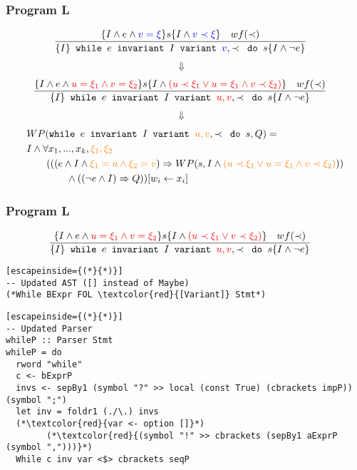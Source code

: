 \begin{frame}[containsverbatim]
  \frametitle{Program L}
\begin{align*}
  &\frac{
    \{I \land e \land \textcolor{blue}{v = \xi} \} s \{I \land \textcolor{blue}{v \prec \xi} \} \quad wf(\prec)
  }{
    \{I\} \texttt{ while } e \texttt{ invariant } I
          \texttt{ variant } \textcolor{blue}{v}, \prec \texttt{ do } s \{I \land \neg e\}
  }
\end{align*}
\begin{align*}
  \Downarrow &
\end{align*}
\begin{align*}
  &\frac{
    \{I \land e \land \textcolor{red}{u = \xi_{1} \land v = \xi_{2}} \} s \{I \land \textcolor{red}{(u \prec \xi_{1} \lor u = \xi_{1} \land v \prec \xi_{2})} \} \quad wf(\prec)
  }{
    \{I\} \texttt{ while } e \texttt{ invariant } I
          \texttt{ variant } \textcolor{red}{u,v} , \prec \texttt{ do } s \{I \land \neg e\}
  }
\end{align*}
\begin{align*}
  \Downarrow &
\end{align*}
\begin{align*}
&WP(
    \texttt{while } e \texttt{ invariant } I
    \texttt{ variant } \textcolor{orange}{u,v}, \prec \texttt{ do } s
, Q)
=\\
&I \land \forall x_1, ..., x_k, \textcolor{orange}{\xi_{1}, \xi_{2}}\\
&\quad \quad (((e \land I \land \textcolor{orange}{\xi_{1} = u \land \xi_{2} = v}) \Rightarrow WP(s, I \land \textcolor{orange}{(u \prec \xi_{1} \lor u = \xi_{1} \land v \prec \xi_{2})})) \\
&\quad \quad \quad \quad \land ((\neg e \land I) \Rightarrow Q)) [w_i \leftarrow x_i] \\
\end{align*}
\end{frame}

\begin{frame}[containsverbatim]
  \frametitle{Program L}
\begin{align*}
  &\frac{
    \{I \land e \land \textcolor{red}{u = \xi_{1} \land v = \xi_{2}} \} s \{I \land \textcolor{red}{(u \prec \xi_{1} \lor v \prec \xi_{2})} \} \quad wf(\prec)
  }{
    \{I\} \texttt{ while } e \texttt{ invariant } I
          \texttt{ variant } \textcolor{red}{u,v} , \prec \texttt{ do } s \{I \land \neg e\}
  }
\end{align*}
\begin{lstlisting}[escapeinside={(*}{*)}]
-- Updated AST ([] instead of Maybe)
(*While BExpr FOL \textcolor{red}{[Variant]} Stmt*)
\end{lstlisting}

\begin{lstlisting}[escapeinside={(*}{*)}]
-- Updated Parser
whileP :: Parser Stmt
whileP = do
  rword "while"
  c <- bExprP
  invs <- sepBy1 (symbol "?" >> local (const True) (cbrackets impP)) (symbol ";")
  let inv = foldr1 (./\.) invs
  (*\textcolor{red}{var <- option []}*)
        (*\textcolor{red}{(symbol "!" >> cbrackets (sepBy1 aExprP (symbol ",")))}*)
  While c inv var <$> cbrackets seqP
\end{lstlisting}
\end{frame}

